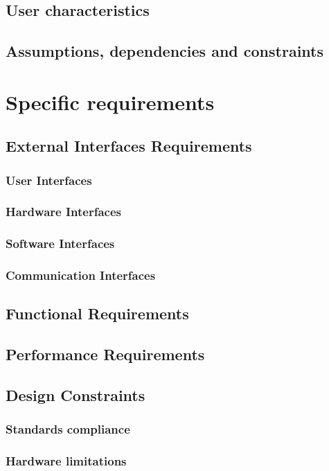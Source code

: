 \documentclass{article}
\begin{document}
   
    
        \subsection{User characteristics}
        \subsection{Assumptions, dependencies and constraints}
        
        
    \section{Specific requirements}
        \subsection{External Interfaces Requirements}
            \subsubsection{User Interfaces}
            \subsubsection{Hardware Interfaces}
            \subsubsection{Software Interfaces}
            \subsubsection{Communication Interfaces}
        \subsection{Functional Requirements}
        \subsection{Performance Requirements}
        \subsection{Design Constraints}
            \subsubsection{Standards compliance}
            \subsubsection{Hardware limitations}
\end{document}
